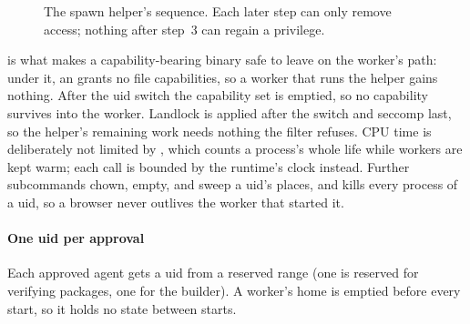 \begin{figure}[t]
\centering
{}
\caption{The spawn helper's sequence. Each later step can only remove
access; nothing after step~3 can regain a privilege.}
\label{fig:layers}
\end{figure}

 is what makes a capability-bearing binary safe to
leave on the worker's path: under it, an  grants no file
capabilities, so a worker that runs the helper gains nothing. After the
uid switch the capability set is emptied, so no capability survives
into the worker. Landlock is applied after the switch and seccomp last,
so the helper's remaining work needs nothing the filter refuses. CPU
time is deliberately not limited by , which counts a
process's whole life while workers are kept warm; each call is bounded
by the runtime's clock instead. Further subcommands chown, empty, and
sweep a uid's places, and  kills every process of a uid, so
a browser never outlives the worker that started it.

\paragraph{One uid per approval}
Each approved agent gets a uid from a reserved range (one is reserved
for verifying packages, one for the builder). A worker's home is
emptied before every start, so it holds no state between starts.

